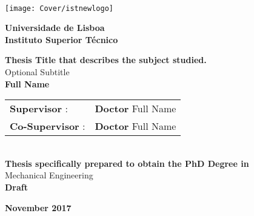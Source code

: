 \setcounter{page}{1} 


\thispagestyle{empty}
\begin{flushleft} ~\\ \vspace{-12mm} \hspace{-12mm}  \texttt{[image: Cover/istnewlogo]} 
 
\centering
\LARGE \textbf{Universidade de Lisboa \\ Instituto Superior Técnico}
\vspace{30mm}

 \vspace{5mm}
 
\centering
\LARGE \textbf{Thesis Title that describes the subject studied.}
\\ \vspace{10mm}
\Large Optional Subtitle
\\ \vspace{15mm}
\Large \textbf{Full Name} \\
\vspace{4cm}

\begin{minipage}{\textwidth}
\begin{tabularx}{\textwidth}{ l @{ } l }
\large \textbf{Supervisor} : & \textbf{Doctor} Full Name\\
 \large \textbf{Co-Supervisor} :  & \textbf{Doctor} Full Name\\
\end{tabularx}

\end{minipage}
%
\\ \vspace{27mm}
\centering
\large \textbf{Thesis specifically prepared to obtain the PhD Degree in}\\
\large Mechanical Engineering\\
\vspace{18mm}
\Large \textbf{Draft}
 
\vspace{15mm}

\large \textbf{November 2017} \\
\let\thepage\relax
\end{flushleft}
\pagebreak
